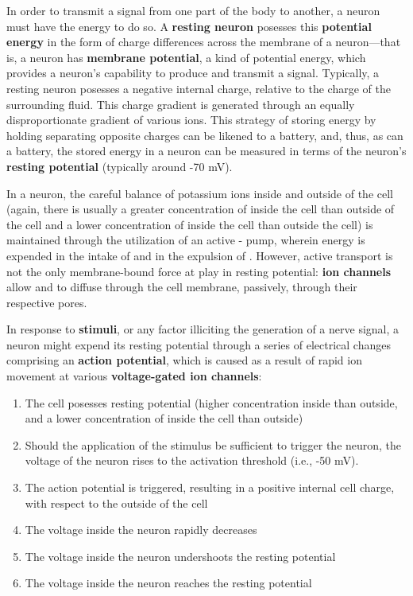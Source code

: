\documentclass{article}
\begin{document}
In order to transmit a signal from one part of the body to another, a neuron
must have the energy to do so. A \textbf{resting neuron} posesses this
\textbf{potential energy} in the form of charge differences across the membrane
of a neuron---that is, a neuron has \textbf{membrane potential}, a kind of
potential energy, which provides a neuron's capability to produce and transmit
a signal. Typically, a resting neuron posesses a negative internal charge,
relative to the charge of the surrounding fluid. This charge gradient is
generated through an equally disproportionate gradient of various ions. This
strategy of storing energy by holding separating opposite charges can be likened
to a battery, and, thus, as can a battery, the stored energy in a neuron can be
measured in terms of the neuron's \textbf{resting potential} (typically around
-70 mV).

In a neuron, the careful balance of potassium ions inside and outside of the cell
(again, there is usually a greater concentration of  inside the cell
than outside of the cell and a lower concentration of  inside the cell
than outside the cell) is maintained through the utilization of an active
- pump, wherein energy is expended in the intake of  and
in the expulsion of . However, active transport is not the only
membrane-bound force at play in resting potential: \textbf{ion channels} allow
 and  to diffuse through the cell membrane, passively, through
their respective pores.

In response to \textbf{stimuli}, or any factor illiciting the generation of a
nerve signal, a neuron might expend its resting potential through a series of
electrical changes comprising an \textbf{action potential}, which is caused as
a result of rapid ion movement at various \textbf{voltage-gated ion channels}:

\begin{enumerate}
	\item The cell posesses resting potential (higher  concentration inside
		than outside, and a lower concentration of  inside the cell than
		outside)
	\item Should the application of the stimulus be sufficient to trigger the
		neuron, the voltage of the neuron rises to the activation threshold
		(i.e., -50 mV).
	\item The action potential is triggered, resulting in a positive internal
		cell charge, with respect to the outside of the cell
	\item The voltage inside the neuron rapidly decreases
	\item The voltage inside the neuron undershoots the resting potential
	\item The voltage inside the neuron reaches the resting potential
\end{enumerate}
\end{document}
